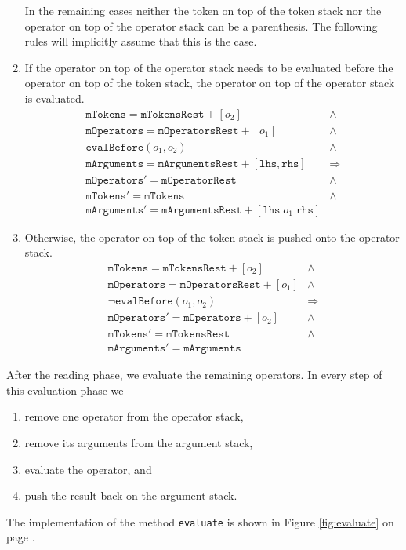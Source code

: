 \begin{enumerate}
      In the remaining cases neither the token on top of the token stack nor the operator on top of the
      operator stack can be a parenthesis.  The following rules will implicitly assume that this is the case.
\item If the operator on top of the operator stack needs to be evaluated before the operator on top of the token stack,
      the operator on top of the operator stack is evaluated.
    $$\begin{array}{lc}
        \texttt{mTokens} = \texttt{mTokensRest} + [o_2]                                        & \wedge \\
        \texttt{mOperators} = \texttt{mOperatorsRest} + [o_1]                                  & \wedge \\
        \texttt{evalBefore}(o_1, o_2)                                                          & \wedge \\ 
        \texttt{mArguments} = \texttt{mArgumentsRest} + [\texttt{lhs}, \texttt{rhs}]           & \Rightarrow \\[0.2cm]
        \texttt{mOperators}' = \texttt{mOperatorRest}                                          & \wedge \\
        \texttt{mTokens}' = \texttt{mTokens}                                                   & \wedge \\
        \texttt{mArguments}' = \texttt{mArgumentsRest} + [\texttt{lhs} \;o_1\; \texttt{rhs}]
        \end{array} 
      $$
\item Otherwise, the operator on top of the token stack is pushed onto the operator stack.
     $$\begin{array}{lc}
         \texttt{mTokens} = \texttt{mTokensRest} + [o_2]           & \wedge \\
         \texttt{mOperators} = \texttt{mOperatorsRest} + [o_1]     & \wedge \\
         \neg \texttt{evalBefore}(o_1, o_2)                        & \Rightarrow \\[0.2cm]
        \texttt{mOperators}' = \texttt{mOperators} + [o_2]         & \wedge \\
        \texttt{mTokens}' = \texttt{mTokensRest}                   & \wedge \\
        \texttt{mArguments}' = \texttt{mArguments}
        \end{array} 
      $$
\end{enumerate}
After the reading phase, we evaluate the remaining operators.  In every step of this evaluation phase we   
\begin{enumerate}
\item remove one operator from the operator stack, 
\item remove its arguments from the argument stack, 
\item evaluate the operator, and 
\item push the result back on the argument stack. 
\end{enumerate}
The implementation of the method \texttt{evaluate} is shown in Figure \ref{fig:evaluate} on page \pageref{fig:evaluate}.

